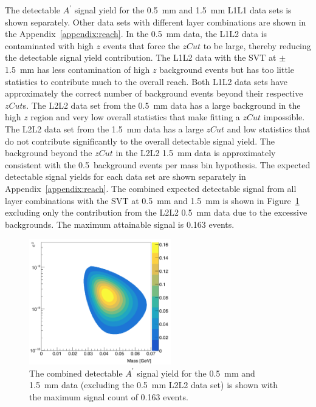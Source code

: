 The detectable $A^{\prime}$ signal yield for the 0.5~mm and 1.5~mm L1L1 data sets is shown separately. Other data sets with different layer combinations are shown in the Appendix~\ref{appendix:reach}. In the 0.5~mm data, the L1L2 data is contaminated with high $z$ events that force the $zCut$ to be large, thereby reducing the detectable signal yield contribution. The L1L2 data with the SVT at $\pm$1.5~mm has less contamination of high $z$ background events but has too little statistics to contribute much to the overall reach. Both L1L2 data sets have approximately the correct number of background events beyond their respective $zCut$s. The L2L2 data set from the 0.5~mm data has a large background in the high $z$ region and very low overall statistics that make fitting a $zCut$ impossible. The L2L2 data set from the 1.5~mm data has a large $zCut$ and low statistics that do not contribute significantly to the overall detectable signal yield. The background beyond the $zCut$ in the L2L2 1.5~mm data is approximately consistent with the 0.5~background events per mass bin hypothesis. The expected detectable signal yields for each data set are shown separately in Appendix~\ref{appendix:reach}. The combined expected detectable signal from all layer combinations with the SVT at 0.5~mm and 1.5~mm is shown in Figure~\ref{fig:comb_reach} excluding only the contribution from the L2L2 0.5~mm data due to the excessive backgrounds. The maximum attainable signal is 0.163 events. 
\begin{figure}[htb]
  \centering
      \includegraphics[width=0.55\textwidth]{pics/results/combinedReach.png}
  \caption[Combined detectable $A^{\prime}$ signal yield from data for the 2015 engineering run]{The combined detectable $A^{\prime}$ signal yield for the 0.5~mm and 1.5~mm data (excluding the 0.5~mm L2L2 data set)  is shown with the maximum signal count of 0.163 events.}
  \label{fig:comb_reach}
\end{figure} 
